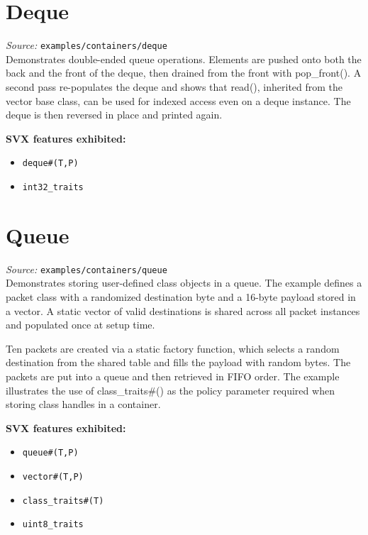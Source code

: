 \documentclass[11pt,letterpaper]{report}
\begin{document}
\section{Deque}

\textit{Source:} \texttt{examples/containers/deque}\\

Demonstrates double-ended queue operations. Elements are pushed onto both the back and the front of the deque, then drained from the front with pop\_front(). A second pass re-populates the deque and shows that read(), inherited from the vector base class, can be used for indexed access even on a deque instance. The deque is then reversed in place and printed again.

\textbf{SVX features exhibited:}

\begin{itemize}
  \item \texttt{deque\#(T,P)}
  \item \texttt{int32\_traits}
\end{itemize}
\section{Queue}

\textit{Source:} \texttt{examples/containers/queue}\\

Demonstrates storing user-defined class objects in a queue. The example defines a packet class with a randomized destination byte and a 16-byte payload stored in a vector. A static vector of valid destinations is shared across all packet instances and populated once at setup time.

Ten packets are created via a static factory function, which selects a random destination from the shared table and fills the payload with random bytes. The packets are put into a queue and then retrieved in FIFO order. The example illustrates the use of class\_traits\#() as the policy parameter required when storing class handles in a container.

\textbf{SVX features exhibited:}

\begin{itemize}
  \item \texttt{queue\#(T,P)}
  \item \texttt{vector\#(T,P)}
  \item \texttt{class\_traits\#(T)}
  \item \texttt{uint8\_traits}
\end{itemize}
\end{document}
